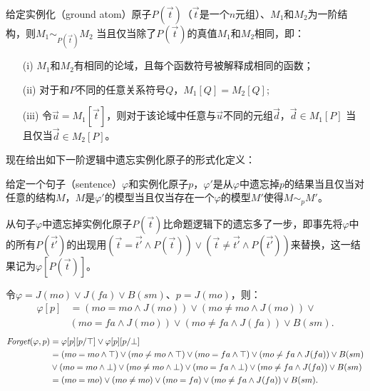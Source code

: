 给定实例化（ground atom）原子$P(\vec{t})$（$\vec{t}$是一个$n$元组）、$M_1$和$M_2$为一阶结构，则$M_1 \sim_{P(\vec{t})} M_2$ 当且仅当除了$P(\vec{t})$的真值$M_1$和$M_2$相同，即：
\begin{itemize}
	\item[(i)] $M_1$和$M_2$有相同的论域，且每个函数符号被解释成相同的函数；
	\item[(ii)] 对于和$P$不同的任意关系符号$Q$，$M_1[Q]=M_2[Q]$;
	\item[(iii)] 令$\vec{u} = M_1[\vec{t}]$，则对于该论域中任意与$\vec{u}$不同的元组$\vec{d}$，$\vec{d} \in M_1[P]$ 当且仅当$\vec{d} \in M_2[P]$。
\end{itemize}

现在给出如下一阶逻辑中遗忘实例化原子的形式化定义：
\begin{definition}\label{def:fol_fogetting}
	给定一个句子（sentence）$\varphi$和实例化原子$p$，$\varphi'$是从$\varphi$中遗忘掉$p$的结果当且仅当对任意的结构$M$，$M$是$\varphi'$的模型当且仅当存在一个$\varphi$的模型$M'$使得$M \sim_p M'$。
\end{definition}

从句子$\varphi$中遗忘掉实例化原子$P(\vec{t})$比命题逻辑下的遗忘多了一步，即事先将$\varphi$中的所有$P(\vec{t'})$的出现用$(\vec{t
} = \vec{t'}\wedge P(\vec{t})) \vee (\vec{t} \not= \vec{t'}\wedge P(\vec{t'}))$来替换，这一结果记为$\varphi[P(\vec{t})]$。

\begin{example}
	令$\varphi=J(mo) \vee J(fa) \vee B(sm)$、$p = J(mo)$，则：
	\begin{align*}
		\varphi[p] & = (mo = mo \wedge J(mo)) \vee (mo \not = mo \wedge J(mo)) \vee \\
		& (mo = fa \wedge J(mo)) \vee (mo \not = fa \wedge J(fa)) \vee B(sm).
	\end{align*}
	\begin{align*}
		\textit{Forget}(\varphi, p) & = \varphi[p][p/\top] \vee \varphi[p][p/\bot]\\
		& =  (mo = mo \wedge \top) \vee (mo \not = mo \wedge \top) \vee  (mo = fa \wedge \top) \vee (mo \not = fa \wedge J(fa)) \vee B(sm) \\
		&\vee (mo = mo \wedge \bot) \vee (mo \not = mo \wedge \bot) \vee  (mo = fa \wedge \bot) \vee (mo \not = fa \wedge J(fa)) \vee B(sm)\\
		& = (mo = mo )\vee (mo \not = mo) \vee  (mo = fa ) \vee  (mo \not = fa \wedge J(fa)) \vee B(sm).
	\end{align*}
\end{example}

